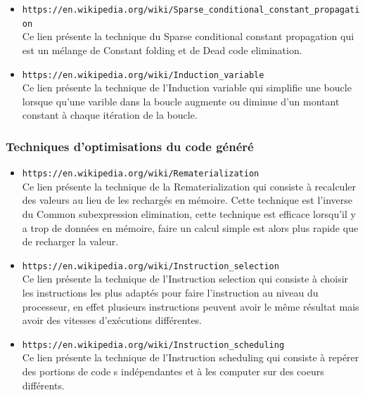 \documentclass[a4paper]{article}
\begin{document}
\begin{itemize}
\item \texttt{https://en.wikipedia.org/wiki/Sparse\_conditional\_constant\_propagation} \\
Ce lien présente la technique du Sparse conditional constant propagation qui est un mélange de Constant folding et de Dead code elimination.\\

\item \texttt{https://en.wikipedia.org/wiki/Induction\_variable} \\
Ce lien présente la technique de l'Induction variable qui simplifie une boucle lorsque qu'une varible dans la boucle augmente ou diminue d'un montant constant à chaque itération de la boucle.\\
     \end{itemize}

\subsubsection{Techniques d'optimisations du code généré}
\begin{itemize}
\item \texttt{https://en.wikipedia.org/wiki/Rematerialization} \\
Ce lien présente la technique de la Rematerialization qui consiste à recalculer des valeurs au lieu de les rechargés en mémoire. Cette technique est l'inverse du Common subexpression elimination, cette technique est efficace lorsqu'il y a trop de données en mémoire, faire un calcul simple est alors plus rapide que de recharger la valeur.\\

\item \texttt{https://en.wikipedia.org/wiki/Instruction\_selection} \\
Ce lien présente la technique de l'Instruction selection qui consiste à choisir les instructions les plus adaptés pour faire l'instruction au niveau du processeur, en effet plusieurs instructions peuvent avoir le même résultat mais avoir des vitesses d'exécutions différentes.\\

\item \texttt{https://en.wikipedia.org/wiki/Instruction\_scheduling} \\
Ce lien présente la technique de l'Instruction scheduling qui consiste à repérer des portions de code s indépendantes et à les computer sur des coeurs différents.\\
     \end{itemize}
\end{document}
